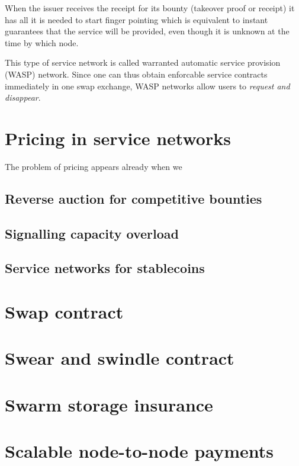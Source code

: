 \documentclass[a4paper,10pt]{article}
\begin{document}
When the issuer receives the receipt for its bounty (takeover proof or receipt)
it has all it is needed to start finger pointing which is equivalent to
instant guarantees that the service will be provided,
even though it is unknown at the time by which node.

This type of service network is called \gls{warranted automatic service provision (WASP)} network.
Since one can thus obtain enforcable service contracts immediately
in one swap exchange, WASP networks allow users to \emph{request and disappear}.

\section{Pricing in service networks}

The problem of pricing appears already when we

\subsection{Reverse auction for competitive bounties}
\subsection{Signalling capacity overload}
\subsection{Service networks for stablecoins}

\cite{btcmicro2014}
\cite{decker2015fast}
\cite{poon2015bitcoin}  %
\cite{prihodko2016flare} %
\cite{tremback2015universal}  %
\cite{bonneau2014mixcoin} %
\cite{ethersphere2016sw3}
\cite{ethersphere2016smash}
\cite{maymounkov2002kademlia}
\cite{heep2010r}
\cite{malavolta2017concurrency}
\cite{chiesa2017decentralized}
\cite{heilman2016tumblebit}
\cite{green2016bolt}
\cite{miller2017sprites}
\cite{mcdonald2017payment}
\cite{diferrante2017payment}


\appendix
\section{Swap contract}
\section{Swear and swindle contract}
\section{Swarm storage insurance}
\section{Scalable node-to-node payments}
\printglossary
\end{document}

